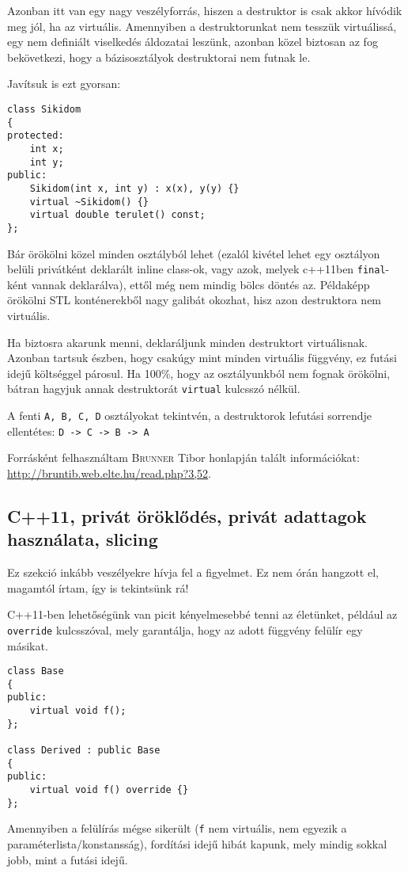 \documentclass[a4paper,11.5pt,table]{article}
\begin{document}
	Azonban itt van egy nagy veszélyforrás, hiszen a destruktor is csak akkor hívódik meg jól, ha az virtuális. Amennyiben a destruktorunkat nem tesszük virtuálissá, egy nem definiált viselkedés áldozatai leszünk, azonban közel biztosan az fog bekövetkezi, hogy a bázisosztályok destruktorai nem futnak le.
	
	\smallskip
	Javítsuk is ezt gyorsan:
\begin{lstlisting}
class Sikidom
{
protected:
	int x;
	int y;
public:
	Sikidom(int x, int y) : x(x), y(y) {}
	virtual ~Sikidom() {}
	virtual double terulet() const;
};
\end{lstlisting}
	Bár örökölni közel minden osztályból lehet (ezalól kivétel lehet egy osztályon belüli privátként deklarált inline class-ok, vagy azok, melyek c++11ben \texttt{final}-ként vannak deklarálva), ettől még nem mindig bölcs döntés az. Példaképp örökölni STL konténerekből nagy galibát okozhat, hisz azon destruktora nem virtuális.
	
	\medskip
	Ha biztosra akarunk menni, deklaráljunk minden destruktort virtuálisnak. Azonban tartsuk észben, hogy csakúgy mint minden virtuális függvény, ez futási idejű költséggel párosul. Ha 100\%, hogy az osztályunkból nem fognak örökölni, bátran hagyjuk annak destruktorát \texttt{virtual} kulcsszó nélkül.
	
	\medskip
	A fenti \texttt{A, B, C, D} osztályokat tekintvén, a destruktorok lefutási sorrendje ellentétes:  \texttt{D -> C -> B -> A}
	
	\bigskip
	
	Forrásként felhasználtam \textsc{Brunner} Tibor honlapján talált információkat: \url{http://bruntib.web.elte.hu/read.php?3,52}.
	
	\subsection{C++11, privát öröklődés, privát adattagok használata, slicing}
	Ez szekció inkább veszélyekre hívja fel a figyelmet. Ez nem órán hangzott el, magamtól írtam, így is tekintsünk rá!
	
	\medskip
	C++11-ben lehetőségünk van picit kényelmesebbé tenni az életünket, például az \texttt{override} kulcsszóval, mely garantálja, hogy az adott függvény felülír egy másikat.
	\begin{lstlisting}
class Base
{
public:
	virtual void f();
};

class Derived : public Base
{
public:
	virtual void f() override {}
};
	\end{lstlisting}
	Amennyiben a felülírás mégse sikerült (\texttt{f} nem virtuális, nem egyezik a paraméterlista/konstansság), fordítási idejű hibát kapunk, mely mindig sokkal jobb, mint a futási idejű.
	
\end{document}
